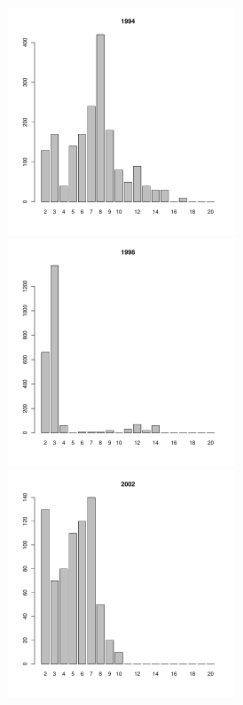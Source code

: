 \begin{figure}[hp]
	\begin{minipage}[b]{.3\linewidth}
	\begin{center}
\includegraphics[width=60mm]{../White_Sea/Luvenga_Goreliy/midlow2_1994_.pdf}
	\end{center}
	\end{minipage}
	\hfill
	\begin{minipage}[b]{.3\linewidth}
	\begin{center}
	\includegraphics[width=60mm]{../White_Sea/Luvenga_Goreliy/midlow2_1998_.pdf}
	\end{center}
	\end{minipage}	
	\hfill
	\begin{minipage}[b]{.3\linewidth}
	\begin{center}
	\includegraphics[width=60mm]{../White_Sea/Luvenga_Goreliy/midlow2_2002_.pdf}
	\end{center}
	\end{minipage}


\end{figure}
